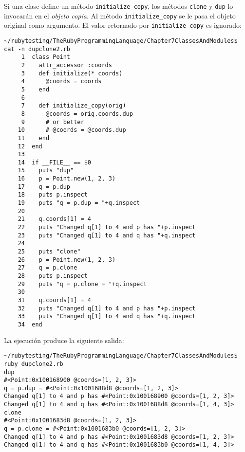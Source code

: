 Si una clase define un método \verb|initialize_copy|,
los métodos \verb|clone| y \verb|dup| lo invocarán en el {\it objeto copia}.
Al método \verb|initialize_copy| se le pasa el objeto original como argumento.
El valor retornado por \verb|initialize_copy| es ignorado:

\begin{verbatim}
~/rubytesting/TheRubyProgrammingLanguage/Chapter7ClassesAndModules$ cat -n dupclone2.rb 
     1  class Point
     2    attr_accessor :coords
     3    def initialize(* coords)
     4      @coords = coords
     5    end
     6  
     7    def initialize_copy(orig)
     8      @coords = orig.coords.dup 
     9      # or better
    10      # @coords = @coords.dup 
    11    end
    12  end
    13  
    14  if __FILE__ == $0
    15    puts "dup"
    16    p = Point.new(1, 2, 3)
    17    q = p.dup
    18    puts p.inspect
    19    puts "q = p.dup = "+q.inspect
    20  
    21    q.coords[1] = 4
    22    puts "Changed q[1] to 4 and p has "+p.inspect
    23    puts "Changed q[1] to 4 and q has "+q.inspect
    24  
    25    puts "clone"
    26    p = Point.new(1, 2, 3)
    27    q = p.clone
    28    puts p.inspect
    29    puts "q = p.clone = "+q.inspect
    30  
    31    q.coords[1] = 4
    32    puts "Changed q[1] to 4 and p has "+p.inspect
    33    puts "Changed q[1] to 4 and q has "+q.inspect
    34  end
\end{verbatim}
La ejecución produce la siguiente salida:
\begin{verbatim}
~/rubytesting/TheRubyProgrammingLanguage/Chapter7ClassesAndModules$ ruby dupclone2.rb 
dup
#<Point:0x100168900 @coords=[1, 2, 3]>
q = p.dup = #<Point:0x1001688d8 @coords=[1, 2, 3]>
Changed q[1] to 4 and p has #<Point:0x100168900 @coords=[1, 2, 3]>
Changed q[1] to 4 and q has #<Point:0x1001688d8 @coords=[1, 4, 3]>
clone
#<Point:0x1001683d8 @coords=[1, 2, 3]>
q = p.clone = #<Point:0x1001683b0 @coords=[1, 2, 3]>
Changed q[1] to 4 and p has #<Point:0x1001683d8 @coords=[1, 2, 3]>
Changed q[1] to 4 and q has #<Point:0x1001683b0 @coords=[1, 4, 3]>
\end{verbatim}

